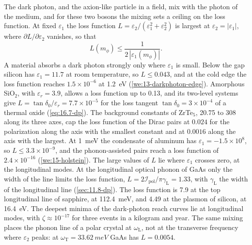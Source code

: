 The dark photon, and the axion-like particle in a field, mix with the photon of the medium, and for these two bosons the mixing sets a ceiling on the loss function. At fixed $\varepsilon_1$ the loss function $L = \varepsilon_2/(\varepsilon_1^2 + \varepsilon_2^2)$ is largest at $\varepsilon_2 = |\varepsilon_1|$, where $\partial L/\partial\varepsilon_2$ vanishes, so that
\begin{equation}
  L(m_\phi) \le \frac{1}{2\,|\varepsilon_1(m_\phi)|} .
  \label{eq:17.2-Lbound}
\end{equation}
A material absorbs a dark photon strongly only where $\varepsilon_1$ is small. Below the gap silicon has $\varepsilon_1 = 11.7$ at room temperature, so $L \le 0.043$, and at the cold edge the loss function reaches $1.5\times10^{-6}$ at \SI{1.2}{eV} (\cref{we:13-darkphoton-edge}). Amorphous SiO$_2$, with $\varepsilon_r = 3.9$, allows a loss function up to 0.13, and its two-level systems give $L = \tan\delta_0/\varepsilon_r = 7.7\times10^{-5}$ for the loss tangent $\tan\delta_0 = 3\times10^{-4}$ of a thermal oxide (\cref{eq:16.7-dp}). The background constants of ZrTe$_5$, 20.75 to 308 along its three axes, cap the loss function of the Dirac pairs at $0.024$ for the polarization along the axis with the smallest constant and at $0.0016$ along the axis with the largest. At \SI{1}{meV} the condensate of aluminum has $\varepsilon_1 = -1.5\times10^8$, so $L \le 3.3\times10^{-9}$, and the phonon-assisted pairs reach a loss function of $2.4\times10^{-16}$ (\cref{we:15-holstein}). The large values of $L$ lie where $\varepsilon_1$ crosses zero, at the longitudinal modes. At the longitudinal optical phonon of GaAs only the width of the line limits the loss function, $L = 2\mathcal{I}_{\mathrm{pol}}/\pi\gamma_{\mathrm{L}} = 1.33$, with $\gamma_{\mathrm{L}}$ the width of the longitudinal line (\cref{sec:11.8-dp}). The loss function is 7.9 at the top longitudinal line of sapphire, at \SI{112.4}{meV}, and 4.49 at the plasmon of silicon, at \SI{16.4}{eV}. The deepest minima of the dark-photon reach curves lie at longitudinal modes, with $\zeta \approx 10^{-17}$ for three events in a kilogram and year. The same mixing places the phonon line of a polar crystal at $\omega_{\mathrm{L}}$, not at the transverse frequency where $\varepsilon_2$ peaks: at $\omega_{\mathrm{T}} = \SI{33.62}{meV}$ GaAs has $L = 0.0054$.

